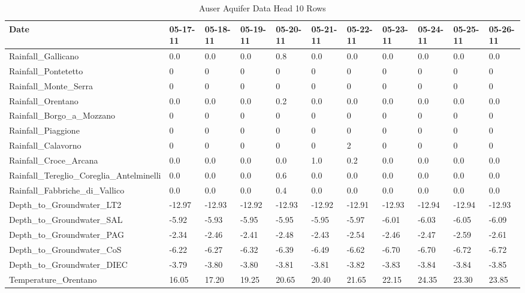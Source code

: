 \documentclass[
]{article}
\begin{document}
\begin{table}
\centering
\caption{\label{tab:data head and data variables kable}Auser Aquifer Data Head 10 Rows}
\centering
\fontsize{12}{14}\selectfont
\begin{tabular}[t]{l|l|l|l|l|l|l|l|l|l|l}
\hline
Date & 05-17-11 & 05-18-11 & 05-19-11 & 05-20-11 & 05-21-11 & 05-22-11 & 05-23-11 & 05-24-11 & 05-25-11 & 05-26-11\\
\hline
Rainfall\_Gallicano & 0.0 & 0.0 & 0.0 & 0.8 & 0.0 & 0.0 & 0.0 & 0.0 & 0.0 & 0.0\\
\hline
Rainfall\_Pontetetto & 0 & 0 & 0 & 0 & 0 & 0 & 0 & 0 & 0 & 0\\
\hline
Rainfall\_Monte\_Serra & 0 & 0 & 0 & 0 & 0 & 0 & 0 & 0 & 0 & 0\\
\hline
Rainfall\_Orentano & 0.0 & 0.0 & 0.0 & 0.2 & 0.0 & 0.0 & 0.0 & 0.0 & 0.0 & 0.0\\
\hline
Rainfall\_Borgo\_a\_Mozzano & 0 & 0 & 0 & 0 & 0 & 0 & 0 & 0 & 0 & 0\\
\hline
Rainfall\_Piaggione & 0 & 0 & 0 & 0 & 0 & 0 & 0 & 0 & 0 & 0\\
\hline
Rainfall\_Calavorno & 0 & 0 & 0 & 0 & 0 & 2 & 0 & 0 & 0 & 0\\
\hline
Rainfall\_Croce\_Arcana & 0.0 & 0.0 & 0.0 & 0.0 & 1.0 & 0.2 & 0.0 & 0.0 & 0.0 & 0.0\\
\hline
Rainfall\_Tereglio\_Coreglia\_Antelminelli & 0.0 & 0.0 & 0.0 & 0.6 & 0.0 & 0.0 & 0.0 & 0.0 & 0.0 & 0.0\\
\hline
Rainfall\_Fabbriche\_di\_Vallico & 0.0 & 0.0 & 0.0 & 0.4 & 0.0 & 0.0 & 0.0 & 0.0 & 0.0 & 0.0\\
\hline
Depth\_to\_Groundwater\_LT2 & -12.97 & -12.93 & -12.92 & -12.93 & -12.92 & -12.91 & -12.93 & -12.94 & -12.94 & -12.93\\
\hline
Depth\_to\_Groundwater\_SAL & -5.92 & -5.93 & -5.95 & -5.95 & -5.95 & -5.97 & -6.01 & -6.03 & -6.05 & -6.09\\
\hline
Depth\_to\_Groundwater\_PAG & -2.34 & -2.46 & -2.41 & -2.48 & -2.43 & -2.54 & -2.46 & -2.47 & -2.59 & -2.61\\
\hline
Depth\_to\_Groundwater\_CoS & -6.22 & -6.27 & -6.32 & -6.39 & -6.49 & -6.62 & -6.70 & -6.70 & -6.72 & -6.72\\
\hline
Depth\_to\_Groundwater\_DIEC & -3.79 & -3.80 & -3.80 & -3.81 & -3.81 & -3.82 & -3.83 & -3.84 & -3.84 & -3.85\\
\hline
Temperature\_Orentano & 16.05 & 17.20 & 19.25 & 20.65 & 20.40 & 21.65 & 22.15 & 24.35 & 23.30 & 23.85\\

\end{tabular}
\end{table}
\end{document}
